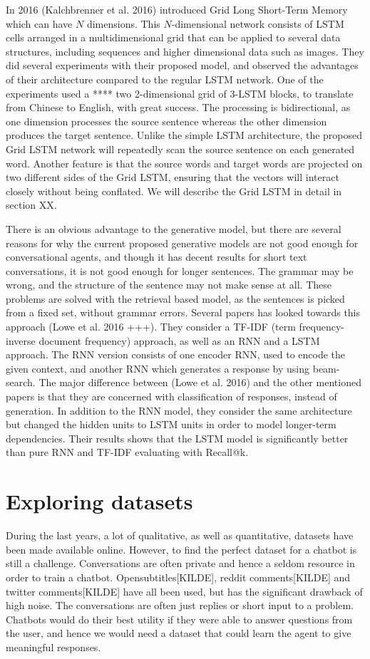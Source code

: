 \documentclass{article} %
\begin{document}
In 2016 (Kalchbrenner et al. 2016) introduced Grid Long Short-Term Memory which can have $N$ dimensions. This $N$-dimensional network consists of LSTM cells arranged in a multidimensional grid that can be applied to several data structures, including sequences and higher dimensional data such as images. They did several experiments with their proposed model, and observed the advantages of their architecture compared to the regular LSTM network. One of the experiments used a **** two 2-dimensional grid of 3-LSTM blocks, to translate from Chinese to English, with great success. The processing is bidirectional, as one dimension processes the source sentence whereas the other dimension produces the target sentence. Unlike the simple LSTM architecture, the proposed Grid LSTM network will repeatedly scan the source sentence on each generated word. Another feature is that the source words and target words are projected on two different sides of the Grid LSTM, ensuring that the vectors will interact closely without being conflated. We will describe the Grid LSTM in detail in section XX. 

There is an obvious advantage to the generative model, but there are several reasons for why the current proposed generative models are not good enough for conversational agents, and though it has decent results for short text conversations, it is not good enough for longer sentences. The grammar may be wrong, and the structure of the sentence may not make sense at all. These problems are solved with the retrieval based model, as the sentences is picked from a fixed set, without grammar errors. Several papers has looked towards this approach (Lowe et al. 2016 +++). They consider a TF-IDF (term frequency-inverse document frequency) approach, as well as an RNN and a LSTM approach. The RNN version consists of one encoder RNN, used to encode the given context, and another RNN which generates a response by using beam-search. The major difference between (Lowe et al. 2016) and the other mentioned papers is that they are concerned with classification of responses, instead of generation. In addition to the RNN model, they consider the same architecture but changed the hidden units to LSTM units in order to model longer-term dependencies. Their results shows that the LSTM model is significantly better than pure RNN and TF-IDF evaluating with Recall@k.

\section{Exploring datasets}
During the last years, a lot of qualitative, as well as quantitative, datasets have been made available online. However, to find the perfect dataset for a chatbot is still a challenge. Conversations are often private and hence a seldom resource in order to train a chatbot. Opensubtitles[KILDE], reddit comments[KILDE] and twitter comments[KILDE] have all been used, but has the significant drawback of high noise. The conversations are often just replies or short input to a problem. Chatbots would do their best utility if they were able to answer questions from the user, and hence we would need a dataset that could learn the agent to give meaningful responses.
\end{document}
